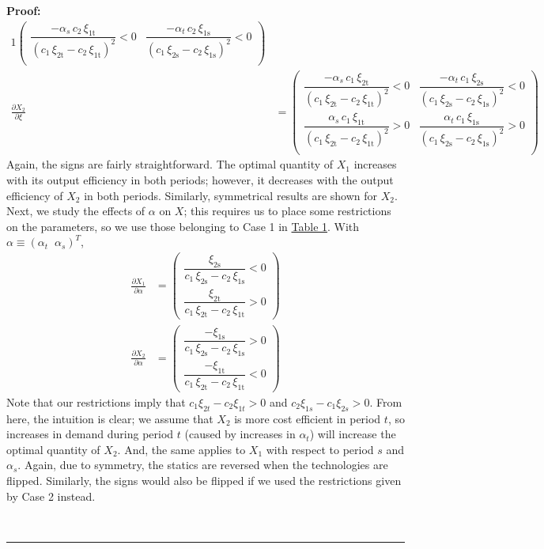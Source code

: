\documentclass[11pt,a4paper]{extarticle}
\newenvironment{proof}[1][Proof]{\noindent\textbf{#1:} }{\ \rule{0.5em}{0.5em}}
\begin{document}
\begin{proof}
\begin{alignat*}{1}
\begin{pmatrix}
	\dfrac{-\alpha _{s}\,c_{2}\,\xi _{\mathrm{1t}}}{{\left(c_{1}\,\xi _{\mathrm{2t}}-c_{2}\,\xi _{\mathrm{1t}}\right)}^2}<0 & \dfrac{-\alpha _{t}\,c_{2}\,\xi _{\mathrm{1s}}}{{\left(c_{1}\,\xi _{\mathrm{2s}}-c_{2}\,\xi _{\mathrm{1s}}\right)}^2}<0 \\
	\end{pmatrix}\\
	\frac{\partial X_2}{\partial \xi} &= 
	\begin{pmatrix}
	\dfrac{-\alpha _{s}\,c_{1}\,\xi _{\mathrm{2t}}}{{\left(c_{1}\,\xi _{\mathrm{2t}}-c_{2}\,\xi _{\mathrm{1t}}\right)}^2} <0& \dfrac{-\alpha _{t}\,c_{1}\,\xi _{\mathrm{2s}}}{{\left(c_{1}\,\xi _{\mathrm{2s}}-c_{2}\,\xi _{\mathrm{1s}}\right)}^2} <0\\
	\dfrac{\alpha _{s}\,c_{1}\,\xi _{\mathrm{1t}}}{{\left(c_{1}\,\xi _{\mathrm{2t}}-c_{2}\,\xi _{\mathrm{1t}}\right)}^2}>0& \dfrac{\alpha _{t}\,c_{1}\,\xi _{\mathrm{1s}}}{{\left(c_{1}\,\xi _{\mathrm{2s}}-c_{2}\,\xi _{\mathrm{1s}}\right)}^2} >0\\
	\end{pmatrix}
	\end{alignat*}
	Again, the signs are fairly straightforward. The optimal quantity of $X_1$ increases with its output efficiency in both periods; however, it decreases with the output efficiency of $X_2$ in both periods. Similarly, symmetrical results are shown for $X_2$. Next, we study the effects of $\alpha$ on $X$; this requires us to place some restrictions on the parameters, so we use those belonging to Case 1 in \hyperref[tab:paramrest]{Table 1}. With $\alpha \equiv \left( \alpha_t \;\; \alpha_s \right)^T$, 
	\begin{align*}
	\frac{\partial X_1}{\partial \alpha} &= 
	\begin{pmatrix}
	\dfrac{\xi _{\mathrm{2s}}}{c_{1}\,\xi _{\mathrm{2s}}-c_{2}\,\xi _{\mathrm{1s}}}<0 \\
	\dfrac{\xi _{\mathrm{2t}}}{c_{1}\,\xi _{\mathrm{2t}}-c_{2}\,\xi _{\mathrm{1t}}}>0
	\end{pmatrix}\\
	\frac{\partial X_2}{\partial \alpha} &= 
	\begin{pmatrix}
	\dfrac{-\xi _{\mathrm{1s}}}{c_{1}\,\xi _{\mathrm{2s}}-c_{2}\,\xi _{\mathrm{1s}}}>0 \\
	\dfrac{-\xi _{\mathrm{1t}}}{c_{1}\,\xi _{\mathrm{2t}}-c_{2}\,\xi _{\mathrm{1t}}}<0
	\end{pmatrix}
	\end{align*}
	Note that our restrictions imply that $c_1 \xi_{2t} - c_2 \xi_{1t} > 0$ and $c_2 \xi_{1s} - c_1 \xi_{2s} > 0$. From here, the intuition is clear; we assume that $X_2$ is more cost efficient in period $t$, so increases in demand during period $t$ (caused by increases in $\alpha_t$) will increase the optimal quantity of $X_2$. And, the same applies to $X_1$ with respect to period $s$ and $\alpha_s$. Again, due to symmetry, the statics are reversed when the technologies are flipped. Similarly, the signs would also be flipped if we used the restrictions given by Case 2 instead. 
	

\end{proof}
\end{document}
